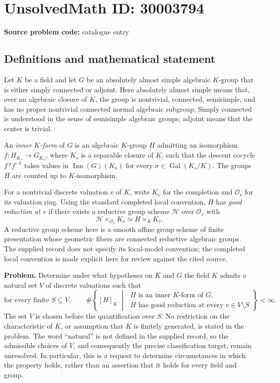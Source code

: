\documentclass[11pt]{article}
\begin{document}
\section*{UnsolvedMath ID: 30003794}
\textbf{Source problem code:} catalogue entry
\subsection{Definitions and mathematical statement}
Let \(K\) be a field and let \(G\) be an absolutely almost simple algebraic \(K\)-group that is either simply connected or adjoint. Here absolutely almost simple means that, over an algebraic closure of \(K\), the group is nontrivial, connected, semisimple, and has no proper nontrivial connected normal algebraic subgroup. Simply connected is understood in the sense of semisimple algebraic groups; adjoint means that the center is trivial.

An \emph{inner \(K\)-form} of \(G\) is an algebraic \(K\)-group \(H\) admitting an isomorphism \(f:H_{K_s}\to G_{K_s}\), where \(K_s\) is a separable closure of \(K\), such that the descent cocycle \(f\,{}^{\sigma}\!f^{-1}\) takes values in \(\operatorname{Inn}(G)(K_s)\) for every \(\sigma\in\operatorname{Gal}(K_s/K)\). The groups \(H\) are counted up to \(K\)-isomorphism.

For a nontrivial discrete valuation \(v\) of \(K\), write \(K_v\) for the completion and \(\mathcal O_v\) for its valuation ring. Using the standard completed local convention, \(H\) has \emph{good reduction at \(v\)} if there exists a reductive group scheme \(\mathcal H\) over \(\mathcal O_v\) with
\[
\mathcal H\times_{\mathcal O_v}K_v\simeq H\times_K K_v.
\]
A reductive group scheme here is a smooth affine group scheme of finite presentation whose geometric fibers are connected reductive algebraic groups. The supplied record does not specify its local-model convention; the completed local convention is made explicit here for review against the cited source.

\textbf{Problem.} Determine under what hypotheses on \(K\) and \(G\) the field \(K\) admits a natural set \(V\) of discrete valuations such that
\[
\text{for every finite }S\subseteq V,\qquad
\#\left\{
[H]_K\;\middle|\;
\begin{gathered}
H\text{ is an inner }K\text{-form of }G,\\
H\text{ has good reduction at every }v\in V\setminus S
\end{gathered}
\right\}<\infty.
\]
The set \(V\) is chosen before the quantification over \(S\). No restriction on the characteristic of \(K\), or assumption that \(K\) is finitely generated, is stated in the problem. The word ``natural'' is not defined in the supplied record, so the admissible choices of \(V\), and consequently the precise classification target, remain unresolved. In particular, this is a request to determine circumstances in which the property holds, rather than an assertion that it holds for every field and group.
\end{document}
